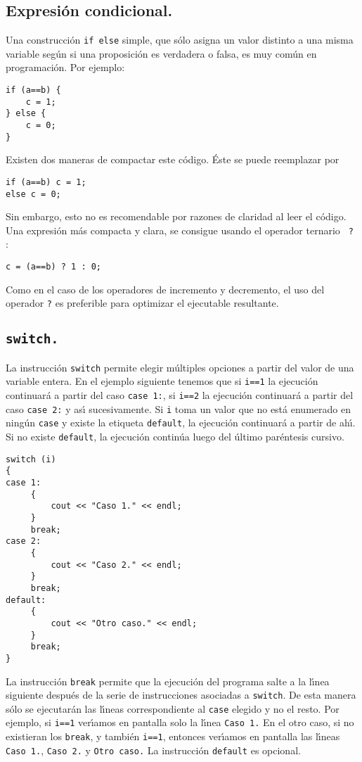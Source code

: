 \subsection{Expresi{\'o}n condicional.}

Una construcci{\'o}n \verb|if else| simple, que s{\'o}lo asigna un valor
distinto a una misma variable seg{\'u}n si una proposici{\'o}n es verdadera o
falsa, es muy com{\'u}n en programaci{\'o}n. Por ejemplo:
\begin{verbatim}
if (a==b) {
    c = 1;
} else {
    c = 0;
}
\end{verbatim}
Existen dos maneras de compactar este c{\'o}digo. {\'E}ste se puede
reemplazar por
\begin{verbatim}
if (a==b) c = 1;
else c = 0;
\end{verbatim}
Sin embargo,  esto no es  recomendable por razones de claridad al leer
el c{\'o}digo. Una expresi{\'o}n m{\'a}s compacta y clara, se consigue usando el operador ternario
\verb| ? |:
\begin{verbatim}
c = (a==b) ? 1 : 0;
\end{verbatim}

Como en el caso de los operadores de incremento y decremento, el uso
del operador \verb+?+ es preferible para optimizar el ejecutable
resultante. 

\subsection{\tt switch.}

La instrucci{\'o}n \verb|switch|  permite elegir m{\'u}ltiples opciones a
partir del valor de una variable entera. En el ejemplo siguiente
tenemos que si \verb|i==1| la ejecuci{\'o}n continuar{\'a} a partir del caso
\verb|case 1:|, si \verb|i==2|  la ejecuci{\'o}n continuar{\'a} a partir del
caso \verb|case 2:| y as{\'\i} sucesivamente. Si \verb|i| toma un valor que
no est{\'a} enumerado en ning{\'u}n \verb|case| y existe la etiqueta
\verb|default|, la ejecuci{\'o}n continuar{\'a} a partir de
ah{\'\i}. Si no existe \verb+default+, la ejecuci\'on contin\'ua luego
del \'ultimo par\'entesis cursivo.

\begin{verbatim}
switch (i)
{
case 1:
     {
         cout << "Caso 1." << endl;
     }
     break;
case 2:
     {
         cout << "Caso 2." << endl;
     }
     break;
default:
     {
         cout << "Otro caso." << endl;
     }
     break;
}     
\end{verbatim}
La instrucci{\'o}n \verb+break+ permite que la ejecuci{\'o}n del programa
salte a la l{\'\i}nea siguiente despu{\'e}s de la serie de instrucciones
asociadas a \verb+switch+. De esta manera s{\'o}lo se ejecutar{\'a}n  las l{\'\i}neas
correspondiente al \verb|case| elegido y no el resto.  Por ejemplo, si
\verb|i==1| ver{\'\i}amos en pantalla solo la l{\'\i}nea \verb+Caso 1.+
En el otro caso, si no existieran los \verb+break+, y tambi{\'e}n
\verb|i==1|, entonces ver{\'\i}amos en pantalla las l{\'\i}neas \verb+Caso 1.+,
\verb+Caso 2.+ y \verb+Otro caso.+ La instrucci{\'o}n \verb+default+ es
opcional.


